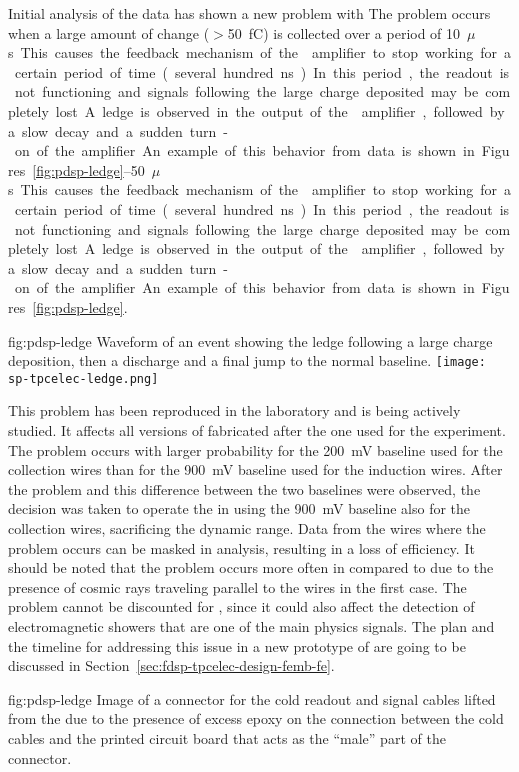 Initial analysis of the  data has shown a new problem 
with  The problem occurs when a large amount of 
change ($>$\SI{50}{fC}) is collected over a period of \SIrange{10}{50}{$\mu$s}.
This causes the feedback mechanism of the  amplifier 
to stop working for a certain period of time (several hundred ns). 
In this period, the readout is not functioning and signals following 
the large charge deposited may be completely lost. A ledge is observed 
in the output of the  amplifier, followed by a slow decay 
and a sudden turn-on of the amplifier. An example of this behavior 
from data is shown in Figures~\ref{fig:pdsp-ledge}.

\begin{dunefigure}
{fig:pdsp-ledge}
{Waveform of an event showing the ledge following a large charge 
deposition, then a discharge and a final jump to the normal baseline.}
\texttt{[image: sp-tpcelec-ledge.png]}
\end{dunefigure}

This problem has been reproduced in the laboratory and is being actively 
studied. It affects all versions of  fabricated after 
the one used for the  experiment. The problem occurs 
with larger probability for the \SI{200}{mV} baseline used for the collection
wires than for the \SI{900}{mV} baseline used for the induction wires.
After the problem and this difference between the two baselines were 
observed, the decision was taken to operate the  in  
using the \SI{900}{mV} baseline also for the collection wires, sacrificing
the dynamic range. Data from the wires where the problem occurs can
be masked in analysis, resulting in a loss of efficiency. It should be
noted that the problem occurs more often in  compared to
 due to the presence of cosmic rays traveling parallel
to the  wires in the first case. The problem cannot be 
discounted for , since it could also affect the detection
of electromagnetic showers that are one of the main physics signals.
The plan and the timeline for addressing this issue in a new prototype
of  are going to be discussed in 
Section~\ref{sec:fdsp-tpcelec-design-femb-fe}.


\begin{dunefigure}
{fig:pdsp-ledge}
{Image of a connector for the cold readout and signal cables lifted from
the  due to the presence of excess epoxy on the 
connection between the cold cables and the printed circuit board
that acts as the ``male'' part of the connector.}
\end{dunefigure}

